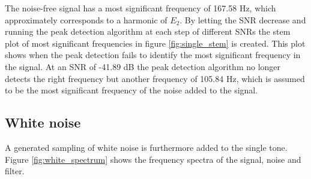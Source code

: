 The noise-free signal has a most significant frequency of 167.58 Hz, which approximately corresponds to a harmonic of $E_2$. By letting the SNR decrease and running the peak detection algorithm at each step of different SNRs the stem plot of most significant frequencies in figure \ref{fig:single_stem} is created. This plot shows when the peak detection fails to identify the most significant frequency in the signal. At an SNR of -41.89 dB the peak detection algorithm no longer detects the right frequency but another frequency of 105.84 Hz, which is assumed to be the most significant frequency of the noise added to the signal.

\subsection{White noise}
A generated sampling of white noise is furthermore added to the single tone. Figure \ref{fig:white_spectrum} shows the frequency spectra of the signal, noise and filter.

